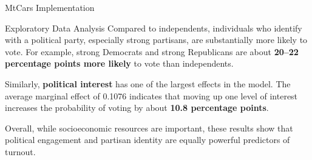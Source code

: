 \documentclass[
  ignorenonframetext,
]{beamer}
\begin{document}
\begin{frame}[fragile]{MtCars Implementation}
\begin{block}{Exploratory Data Analysis}
Compared to independents, individuals who identify with a political
party, especially strong partisans, are substantially more likely to
vote. For example, strong Democrats and strong Republicans are about
\textbf{20--22 percentage points more likely} to vote than independents.

Similarly, \textbf{political interest} has one of the largest effects in
the model. The average marginal effect of 0.1076 indicates that moving
up one level of interest increases the probability of voting by about
\textbf{10.8 percentage points}.

Overall, while socioeconomic resources are important, these results show
that political engagement and partisan identity are equally powerful
predictors of turnout.
\end{block}
\end{frame}
\end{document}
